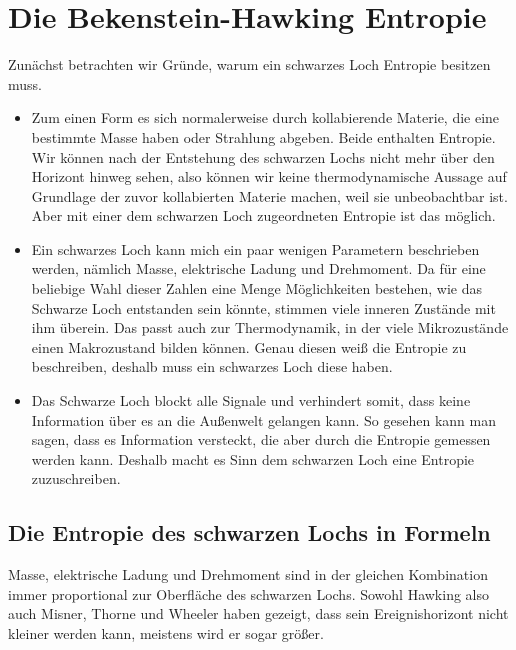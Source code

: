 \documentclass[ngerman]{scrartcl}
\begin{document}
\section{Die Bekenstein-Hawking Entropie} \label{BHEntropie}
Zunächst betrachten wir Gründe, warum ein schwarzes Loch Entropie besitzen muss. 
	\begin{itemize}
		\item Zum einen Form es sich normalerweise durch kollabierende Materie, die eine 	bestimmte Masse haben oder Strahlung abgeben. Beide enthalten 		Entropie. Wir können nach der Entstehung des schwarzen Lochs nicht mehr über den Horizont hinweg sehen, also können wir keine thermodynamische Aussage auf Grundlage der zuvor kollabierten Materie machen, weil sie unbeobachtbar ist. Aber mit einer dem schwarzen Loch zugeordneten Entropie ist das möglich.
		
		\item Ein schwarzes Loch kann mich ein paar wenigen Parametern beschrieben werden, nämlich Masse, elektrische Ladung und Drehmoment. Da für eine beliebige Wahl dieser Zahlen eine Menge Möglichkeiten bestehen, wie das Schwarze Loch entstanden sein könnte, stimmen viele inneren Zustände mit ihm überein. Das passt auch zur Thermodynamik, in der viele Mikrozustände einen Makrozustand bilden können. Genau diesen weiß die Entropie zu beschreiben, deshalb muss ein schwarzes Loch diese haben. 
		
		\item Das Schwarze Loch blockt alle Signale und verhindert somit, dass keine Information über es an die Außenwelt gelangen kann. So gesehen kann man sagen, dass es Information versteckt, die aber durch die Entropie gemessen werden kann. Deshalb macht es Sinn dem schwarzen Loch eine Entropie zuzuschreiben. 
	\end{itemize}
	
	\subsection*{Die Entropie des schwarzen Lochs in Formeln}
	Masse, elektrische Ladung und Drehmoment sind in der gleichen Kombination immer proportional zur Oberfläche des schwarzen Lochs. Sowohl Hawking also auch Misner, Thorne und Wheeler haben gezeigt, dass sein Ereignishorizont nicht kleiner werden kann, meistens wird er sogar größer.
	
\end{document}
